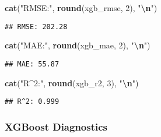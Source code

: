 \documentclass[
]{article}
\newenvironment{Shaded}{\begin{snugshade}}{\end{snugshade}}
\newcommand{\DecValTok}[1]{\textcolor[rgb]{0.00,0.00,0.81}{#1}}
\newcommand{\FunctionTok}[1]{\textcolor[rgb]{0.13,0.29,0.53}{\textbf{#1}}}
\newcommand{\NormalTok}[1]{#1}
\newcommand{\SpecialCharTok}[1]{\textcolor[rgb]{0.81,0.36,0.00}{\textbf{#1}}}
\newcommand{\StringTok}[1]{\textcolor[rgb]{0.31,0.60,0.02}{#1}}
\begin{document}
\begin{Shaded}
\begin{Highlighting}[]
\FunctionTok{cat}\NormalTok{(}\StringTok{"RMSE:"}\NormalTok{, }\FunctionTok{round}\NormalTok{(xgb\_rmse, }\DecValTok{2}\NormalTok{), }\StringTok{"}\SpecialCharTok{\textbackslash{}n}\StringTok{"}\NormalTok{)}
\end{Highlighting}
\end{Shaded}

\begin{verbatim}
## RMSE: 202.28
\end{verbatim}

\begin{Shaded}
\begin{Highlighting}[]
\FunctionTok{cat}\NormalTok{(}\StringTok{"MAE:"}\NormalTok{, }\FunctionTok{round}\NormalTok{(xgb\_mae, }\DecValTok{2}\NormalTok{), }\StringTok{"}\SpecialCharTok{\textbackslash{}n}\StringTok{"}\NormalTok{)}
\end{Highlighting}
\end{Shaded}

\begin{verbatim}
## MAE: 55.87
\end{verbatim}

\begin{Shaded}
\begin{Highlighting}[]
\FunctionTok{cat}\NormalTok{(}\StringTok{"R\^{}2:"}\NormalTok{, }\FunctionTok{round}\NormalTok{(xgb\_r2, }\DecValTok{3}\NormalTok{), }\StringTok{"}\SpecialCharTok{\textbackslash{}n}\StringTok{"}\NormalTok{)}
\end{Highlighting}
\end{Shaded}

\begin{verbatim}
## R^2: 0.999
\end{verbatim}

\subsubsection{XGBoost Diagnostics}\label{xgboost-diagnostics}
\end{document}
